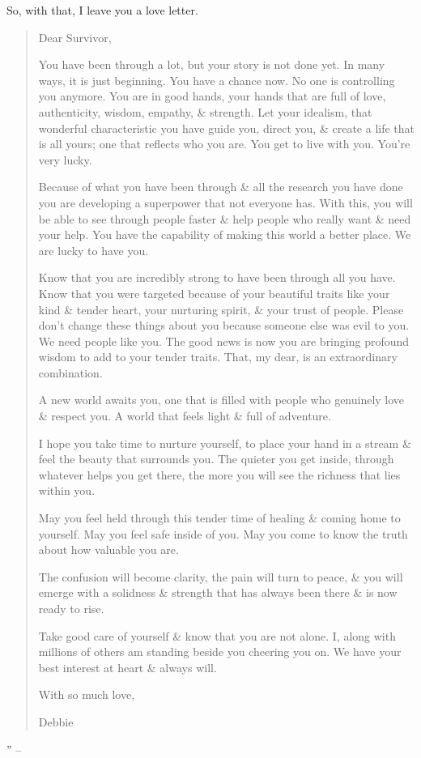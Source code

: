 \documentclass{article}
\numberwithin{equation}{section}
\begin{document}
So, with that, I leave you a love letter.
\begin{quotation}
	Dear Survivor,
	
	You have been through a lot, but your story is not done yet. In many ways, it is just beginning. You have a chance now. No one is controlling you anymore. You are in good hands, your hands that are full of love, authenticity, wisdom, empathy, \& strength. Let your idealism, that wonderful characteristic you have guide you, direct you, \& create a life that is all yours; one that reflects who you are. You get to live with you. You're very lucky.
	
	Because of what you have been through \& all the research you have done you are developing a superpower that not everyone has. With this, you will be able to see through people faster \& help people who really want \& need your help. You have the capability of making this world a better place. We are lucky to have you.
	
	Know that you are incredibly strong to have been through all you have. Know that you were targeted because of your beautiful traits like your kind \& tender heart, your nurturing spirit, \& your trust of people. Please don't change these things about you because someone else was evil to you. We need people like you. The good news is now you are bringing profound wisdom to add to your tender traits. That, my dear, is an extraordinary combination.
	
	A new world awaits you, one that is filled with people who genuinely love \& respect you. A world that feels light \& full of adventure.
	
	I hope you take time to nurture yourself, to place your hand in a stream \& feel the beauty that surrounds you. The quieter you get inside, through whatever helps you get there, the more you will see the richness that lies within you.
	
	May you feel held through this tender time of healing \& coming home to yourself. May you feel safe inside of you. May you come to know the truth about how valuable you are.
	
	The confusion will become clarity, the pain will turn to peace, \& you will emerge with a solidness \& strength that has always been there \& is now ready to rise.
	
	Take good care of yourself \& know that you are not alone. I, along with millions of others am standing beside you cheering you on. We have your best interest at heart \& always will.
	\begin{flushright}
		With so much love,
		
		Debbie
	\end{flushright}
\end{quotation}
'' -- \cite[pp. 169--170]{Mirza2017}
\end{document}
